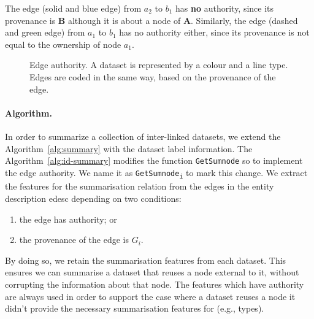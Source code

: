 The edge (solid and blue edge) from $a_2$ to $b_1$ has \textbf{no} authority, since its provenance is {\bfseries B} although it is about a node of {\bfseries A}. Similarly, the edge (dashed and green edge) from $a_1$ to $b_1$ has no authority either, since its provenance is not equal to the ownership of node $a_1$.

\begin{figure}
	\centering
	
	\caption{Edge authority. A dataset is represented by a colour and a line type. Edges are coded in the same way, based on the provenance of the edge.}
	\label{fig:authority}
\end{figure}

\paragraph{Algorithm.}


In order to summarize a collection of inter-linked datasets, we extend the Algorithm~\ref{alg:summary} with the dataset label information.
The Algorithm~\ref{alg:id-summary} modifies the function \texttt{GetSumnode} so to implement the edge authority.
We name it as \texttt{GetSumnode\textsubscript{i}} to mark this change.
We extract the features for the summarisation relation from the edges in the entity description \gls{edesc} depending on two conditions:
\begin{enumerate}[topsep=0pt,itemsep=-1ex,partopsep=1ex,parsep=1ex]
\item the edge has authority; or
\item the provenance of the edge is $G_i$.
\end{enumerate}
By doing so, we retain the summarisation features from each dataset. This ensures we can summarise a dataset that reuses a node external to it, without corrupting the information about that node. The features which have authority are always used in order to support the case where a dataset reuses a node it didn't provide the necessary summarisation features for (e.g., types).

